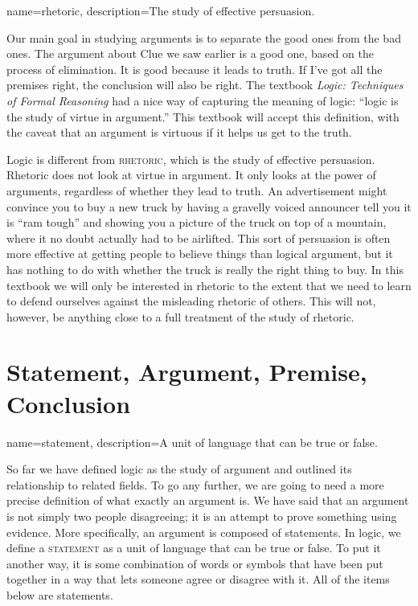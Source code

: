 {
name=rhetoric,
description={The study of effective persuasion.}
}


Our main goal in studying arguments is to separate the good ones from the bad ones. The argument about Clue we saw earlier is a good one, based on the process of elimination.  It is good because it leads to truth. If I've got all the premises right, the conclusion will also be right. The textbook \textit{Logic: Techniques of Formal Reasoning} \citep{Kalish1980} had a nice way of capturing the meaning of logic: ``logic is the study of virtue in argument.'' \label{virtue_in_argument} This textbook will accept this definition, with the caveat that an argument is virtuous if it helps us get to the truth.

Logic is different from \textsc{\gls{rhetoric}}, which is the study of effective persuasion. Rhetoric does not look at virtue in argument. It only looks at the power of arguments, regardless of whether they lead to truth. An advertisement might convince you to buy a new truck by having a gravelly voiced announcer tell you it is ``ram tough'' and showing you a picture of the truck on top of a mountain, where it no doubt actually had to be airlifted. This sort of persuasion is often more effective at getting people to believe things than logical argument, but it has nothing to do with whether the truck is really the right thing to buy. In this textbook we will only be interested in rhetoric to the extent that we need to learn to defend ourselves against the misleading rhetoric of others. This will not, however, be anything close to a full treatment of the study of rhetoric.



\section{Statement, Argument, Premise, Conclusion}
\label{sec:SAPC}

{
name=statement,
description={A unit of language that can be true or false.}
}

So far we have defined logic as the study of argument and outlined its relationship to related fields. To go any further, we are going to need a more precise definition of what exactly an argument is. We have said that an argument is not simply two people disagreeing; it is an attempt to prove something using evidence. More specifically, an argument is composed of statements. In logic, we define a \textsc{statement} \label{def:Statement} as a unit of language that can be true or false. To put it another way, it is some combination of words or symbols that have been put together in a way that lets someone agree or disagree with it. All of the items below are statements.


